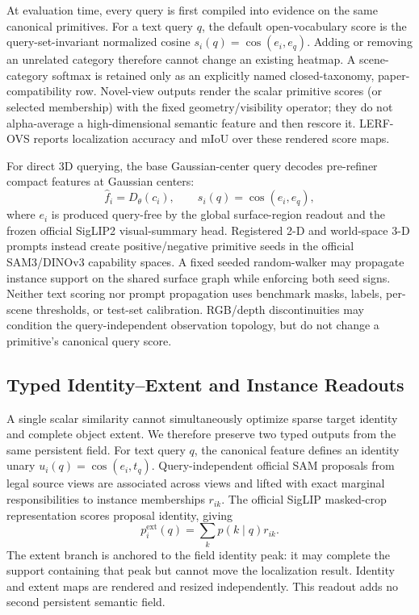 \documentclass[journal,twoside]{IEEEtran}
\begin{document}
At evaluation time, every query is first compiled into evidence on the same
canonical primitives.  For a text query $q$, the default open-vocabulary score
is the query-set-invariant normalized cosine
\(s_i(q)=\cos(e_i,e_q)\).  Adding or removing an unrelated category therefore
cannot change an existing heatmap.  A scene-category softmax is retained only
as an explicitly named closed-taxonomy, paper-compatibility row.  Novel-view
outputs render the scalar primitive scores (or selected membership) with the
fixed geometry/visibility operator; they do not alpha-average a high-dimensional
semantic feature and then rescore it.  LERF-OVS reports localization accuracy
and mIoU over these rendered score maps.

For direct 3D querying, the base Gaussian-center query decodes pre-refiner
compact features at Gaussian centers:
\[
  \hat{f}_i = D_{\theta}(c_i), \qquad
  s_i(q) = \cos(e_i, e_q),
\]
where $e_i$ is produced query-free by the global surface-region readout and the
frozen official SigLIP2 visual-summary head.  Registered 2-D and world-space
3-D prompts instead create positive/negative primitive seeds in the official
SAM3/DINOv3 capability spaces.  A fixed seeded random-walker may propagate
instance support on the shared surface graph while enforcing both seed signs.
Neither text scoring nor prompt propagation uses benchmark masks, labels,
per-scene thresholds, or test-set calibration.  RGB/depth discontinuities may
condition the query-independent observation topology, but do not change a
primitive's canonical query score.

\subsection{Typed Identity--Extent and Instance Readouts}

A single scalar similarity cannot simultaneously optimize sparse target
identity and complete object extent.  We therefore preserve two typed outputs
from the same persistent field.  For text query $q$, the canonical feature
defines an identity unary $u_i(q)=\cos(e_i,t_q)$.  Query-independent official
SAM proposals from legal source views are associated across views and lifted
with exact marginal responsibilities to instance memberships $r_{ik}$.  The
official SigLIP masked-crop representation scores proposal identity, giving
\begin{equation}
 p_i^{\mathrm{ext}}(q)=\sum_k p(k\mid q)r_{ik}.
\end{equation}
The extent branch is anchored to the field identity peak: it may complete the
support containing that peak but cannot move the localization result.  Identity
and extent maps are rendered and resized independently.  This readout adds no
second persistent semantic field.
\end{document}
